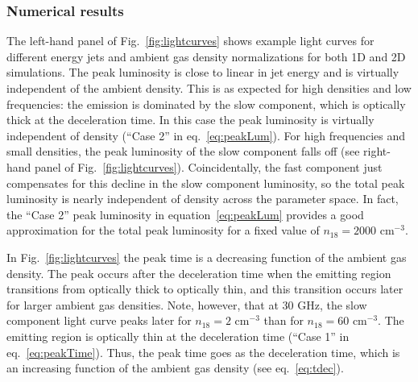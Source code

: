 \documentclass[usenatbib,fleqn]{mnras}
\begin{document}
\subsubsection{Numerical results}
The left-hand panel of Fig.~\ref{fig:lightcurves} shows example light
curves for different energy jets and ambient gas density normalizations for both
1D and 2D simulations. The peak luminosity is close to linear in jet
energy and is virtually independent of the ambient density.  This is as expected
for high densities and low frequencies: the emission is dominated by
the slow component, which is optically thick at the deceleration
time. In this case the peak luminosity is virtually independent of
density (``Case 2'' in eq.~\ref{eq:peakLum}). For high frequencies and
small densities, the peak luminosity of the slow component falls off
(see right-hand panel of Fig.~\ref{fig:lightcurves}). Coincidentally,
the fast component just compensates for this decline in the slow
component luminosity, so the total peak luminosity is nearly
independent of density across the parameter space. In fact, the ``Case
2'' peak luminosity in equation~\ref{eq:peakLum} provides a good
approximation for the total peak luminosity for a fixed value of
$n_{18}=2000$ cm$^{-3}$.

In Fig.~\ref{fig:lightcurves} the peak time is a decreasing function of
the ambient gas density. The peak occurs after the deceleration time
when the emitting region transitions from optically thick to optically
thin, and this transition occurs later for larger ambient gas
densities. Note, however, that at 30 GHz, the slow component light
curve peaks later for $n_{18}=2$ cm$^{-3}$ than for $n_{18}=60$
cm$^{-3}$. The emitting region is optically thin at the deceleration
time (``Case 1'' in eq.~\ref{eq:peakTime}). Thus, the peak time goes
as the deceleration time, which is an increasing function of the
ambient gas density (see eq.~\ref{eq:tdec}).
\end{document}
